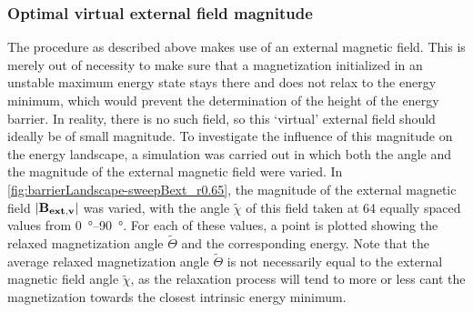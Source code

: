 \documentclass[11pt,a4paper,english]{article}
\begin{document}
\subsubsection{Optimal virtual external field magnitude}
The procedure as described above makes use of an external magnetic field. This is merely out of necessity to make sure that a magnetization initialized in an unstable maximum energy state stays there and does not relax to the energy minimum, which would prevent the determination of the height of the energy barrier. In reality, there is no such field, so this `virtual' external field should ideally be of small magnitude. To investigate the influence of this magnitude on the energy landscape, a simulation was carried out in which both the angle and the magnitude of the external magnetic field were varied. In \cref{fig:barrierLandscape-sweepBext_r0.65}, the magnitude of the external magnetic field $\abs{\vb{B_{ext,v}}}$ was varied, with the angle $\widetilde{\chi}$ of this field taken at 64 equally spaced values from \SIrange{0}{90}{\degree}. For each of these values, a point is plotted showing the relaxed magnetization angle $\widetilde{\Theta}$ and the corresponding energy. Note that the average relaxed magnetization angle $\widetilde{\Theta}$ is not necessarily equal to the external magnetic field angle $\widetilde{\chi}$, as the relaxation process will tend to more or less cant the magnetization towards the closest intrinsic energy minimum. \par
\end{document}
